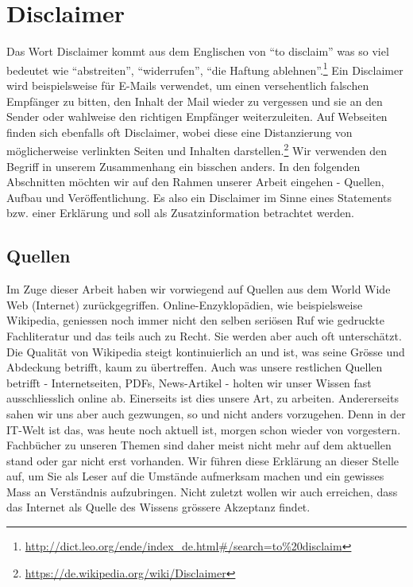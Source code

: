 \section{Disclaimer}
Das Wort Disclaimer kommt aus dem Englischen von ``to disclaim'' was so viel bedeutet wie ``abstreiten'', ``widerrufen'', ``die Haftung ablehnen''.\footnote{\url{http://dict.leo.org/ende/index_de.html\#/search=to\%20disclaim}}
Ein Disclaimer wird beispielsweise für E-Mails verwendet, um einen versehentlich falschen Empfänger zu bitten, den Inhalt der Mail wieder zu vergessen und sie an den Sender oder wahlweise den richtigen Empfänger weiterzuleiten. Auf Webseiten finden sich ebenfalls oft Disclaimer, wobei diese eine Distanzierung von möglicherweise verlinkten Seiten und Inhalten darstellen.\footnote{\url{https://de.wikipedia.org/wiki/Disclaimer}}
Wir verwenden den Begriff in unserem Zusammenhang ein bisschen anders. In den folgenden Abschnitten möchten wir auf den Rahmen unserer Arbeit eingehen - Quellen, Aufbau und Veröffentlichung. Es also ein Disclaimer im Sinne eines Statements bzw. einer Erklärung und soll als Zusatzinformation betrachtet werden.

\subsection{Quellen}
Im Zuge dieser Arbeit haben wir vorwiegend auf Quellen aus dem World Wide Web (Internet) zurückgegriffen. Online-Enzyklopädien, wie beispielsweise Wikipedia, geniessen noch immer nicht den selben seriösen Ruf wie gedruckte Fachliteratur und das teils auch zu Recht. Sie werden aber auch oft unterschätzt. Die Qualität von  Wikipedia steigt kontinuierlich an und ist, was seine Grösse und Abdeckung betrifft, kaum zu übertreffen. Auch was unsere restlichen Quellen betrifft - Internetseiten, PDFs, News-Artikel - holten wir unser Wissen fast ausschliesslich online ab. Einerseits ist dies unsere Art, zu arbeiten. Andererseits sahen wir uns aber auch gezwungen, so und nicht anders vorzugehen. Denn in der IT-Welt ist das, was heute noch aktuell ist, morgen schon wieder von vorgestern. Fachbücher zu unseren Themen sind daher meist nicht mehr auf dem aktuellen stand oder gar nicht erst vorhanden. Wir führen diese Erklärung an dieser Stelle auf, um Sie als Leser auf die Umstände aufmerksam machen und ein gewisses Mass an Verständnis aufzubringen. Nicht zuletzt wollen wir auch erreichen, dass das Internet als Quelle des Wissens grössere Akzeptanz findet.


